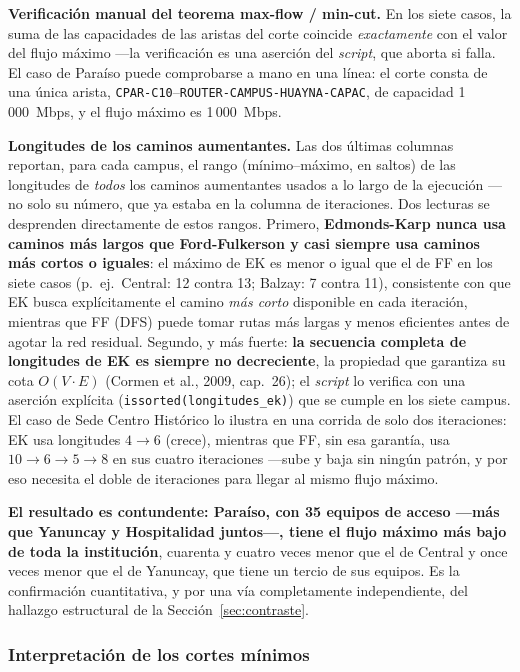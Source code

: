\documentclass[10pt,a4paper]{extarticle}
\newcommand{\code}[1]{\texttt{\small #1}}
\begin{document}
\textbf{Verificación manual del teorema max-flow / min-cut.} En los siete casos, la suma de
las capacidades de las aristas del corte coincide \textit{exactamente} con el valor del
flujo máximo ---la verificación es una aserción del \textit{script}, que aborta si falla. El
caso de Paraíso puede comprobarse a mano en una línea: el corte consta de una única arista,
\code{CPAR-C10}--\code{ROUTER-CAMPUS-HUAYNA-CAPAC}, de capacidad 1\,000~Mbps, y el flujo
máximo es 1\,000~Mbps.

\textbf{Longitudes de los caminos aumentantes.} Las dos últimas columnas reportan, para cada
campus, el rango (mínimo--máximo, en saltos) de las longitudes de \textit{todos} los
caminos aumentantes usados a lo largo de la ejecución ---no solo su número, que ya estaba en
la columna de iteraciones. Dos lecturas se desprenden directamente de estos rangos. Primero,
\textbf{Edmonds-Karp nunca usa caminos más largos que Ford-Fulkerson y casi siempre usa
caminos más cortos o iguales}: el máximo de EK es menor o igual que el de FF en los siete
casos (p.~ej.\ Central: 12 contra 13; Balzay: 7 contra 11), consistente con que EK busca
explícitamente el camino \textit{más corto} disponible en cada iteración, mientras que FF
(DFS) puede tomar rutas más largas y menos eficientes antes de agotar la red residual.
Segundo, y más fuerte: \textbf{la secuencia completa de longitudes de EK es siempre no
decreciente}, la propiedad que garantiza su cota $O(V\!\cdot\!E)$ (Cormen et al., 2009,
cap.~26); el \textit{script} lo verifica con una aserción explícita
(\code{issorted(longitudes\_ek)}) que se cumple en los siete campus. El caso de Sede Centro
Histórico lo ilustra en una corrida de solo dos iteraciones: EK usa longitudes
$4 \to 6$ (crece), mientras que FF, sin esa garantía, usa $10 \to 6 \to 5 \to 8$ en sus
cuatro iteraciones ---sube y baja sin ningún patrón, y por eso necesita el doble de
iteraciones para llegar al mismo flujo máximo.

\textbf{El resultado es contundente: Paraíso, con 35 equipos de acceso ---más que Yanuncay
y Hospitalidad juntos---, tiene el flujo máximo más bajo de toda la institución}, cuarenta y
cuatro veces menor que el de Central y once veces menor que el de Yanuncay, que tiene un
tercio de sus equipos. Es la confirmación cuantitativa, y por una vía completamente
independiente, del hallazgo estructural de la Sección~\ref{sec:contraste}.

\subsubsection{Interpretación de los cortes mínimos}
\end{document}
